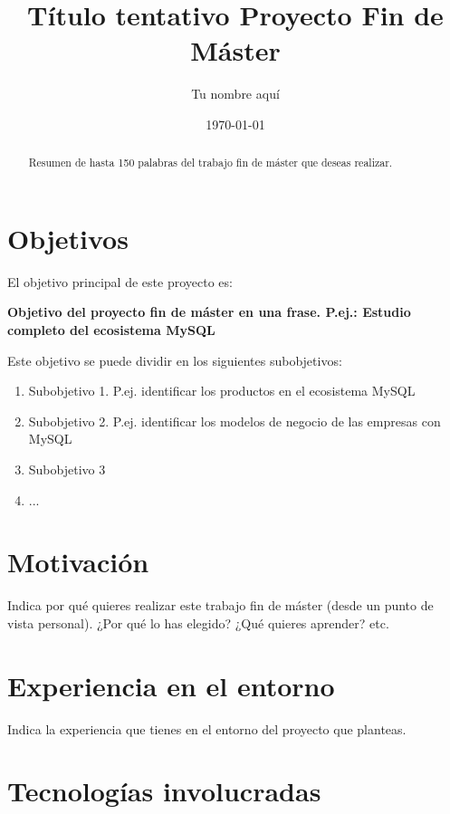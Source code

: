 \documentclass[10pt]{article}
\begin{document}
\title{Título tentativo Proyecto Fin de Máster}
\author{Tu nombre aquí}
\date{\today}


\maketitle

\begin{abstract}
Resumen de hasta 150 palabras del trabajo fin de máster que deseas realizar.
\end{abstract}

\section{Objetivos}

El objetivo principal de este proyecto es:

\begin{center}
\bf{Objetivo del proyecto fin de máster en una frase. P.ej.: Estudio completo del ecosistema MySQL}
\end{center}

Este objetivo se puede dividir en los siguientes subobjetivos:

\begin{enumerate}
  \item Subobjetivo 1. P.ej. identificar los productos en el ecosistema MySQL
  \item Subobjetivo 2. P.ej. identificar los modelos de negocio de las empresas con MySQL
  \item Subobjetivo 3
  \item ...
\end{enumerate}


\section{Motivación}

Indica por qué quieres realizar este trabajo fin de máster (desde un punto de vista personal). ¿Por qué lo has elegido? ¿Qué quieres aprender? etc.


\section{Experiencia en el entorno}

Indica la experiencia que tienes en el entorno del proyecto que planteas.


\section{Tecnologías involucradas}
\end{document}
